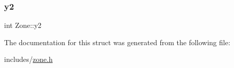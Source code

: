 \mbox{\label{structZone_a7cf6801d4594d045c56368c35fe8c7e2}} 
\subsubsection{\texorpdfstring{y2}{y2}}
{\footnotesize\ttfamily int Zone\+::y2}



The documentation for this struct was generated from the following file\+:\begin{DoxyCompactItemize}
\item 
includes/\hyperlink{zone_8h}{zone.\+h}\end{DoxyCompactItemize}
